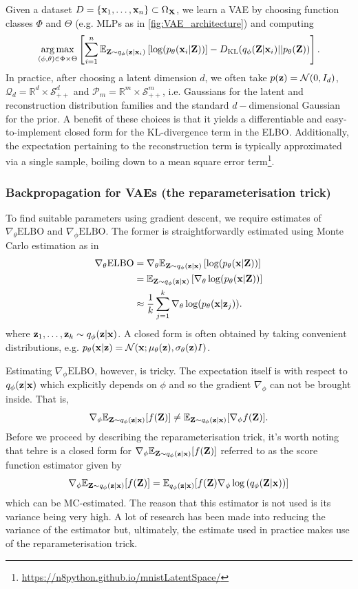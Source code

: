 \documentclass[11pt]{article}
\begin{document}
Given a dataset $D=\{\mathbf{x}_1,\dots,\mathbf{x}_n\}\subset\Omega_{\mathbf{X}}$, we learn a VAE by choosing function classes $\Phi$ and $\Theta$ (e.g. MLPs as in \autoref{fig:VAE_architecture}) and computing
$$
\operatorname*{arg\,max}_{(\phi,\theta)\in\Phi\times\Theta}
\left[
\sum_{i=1}^n
\mathbb{E}_{\mathbf{Z}\sim q_{\phi}(\mathbf{z}|\mathbf{x}_i)}\left[\log(p_{\theta}(\mathbf{x}_i|\mathbf{Z}))\right]-D_{\text{KL}}(q_{\phi}(\mathbf{Z}|\mathbf{x}_i)||p_{\theta}(\mathbf{Z}))
\right].
$$
In practice, after choosing a latent dimension $d$, we often take $p(\mathbf{z})=\mathcal{N}(0,I_d)$, $\mathcal{Q}_d=\mathbb{R}^d\times\mathcal{S}_{++}^d$ and $\mathcal{P}_m=\mathbb{R}^m\times\mathcal{S}_{++}^m$, i.e. Gaussians for the latent and reconstruction distribution families and the standard $d-$dimensional Gaussian for the prior. A benefit of these choices is that it yields a differentiable and easy-to-implement closed form for the KL-divergence term in the ELBO. Additionally, the expectation pertaining to the reconstruction term is typically approximated via a single sample, boiling down to a mean square error term\footnote{\url{https://n8python.github.io/mnistLatentSpace/}}.

\subsubsection{Backpropagation for VAEs (the reparameterisation trick)}
To find suitable parameters using gradient descent, we require estimates of $\nabla_{\theta}\text{ELBO}$ and $\nabla_{\phi}\text{ELBO}$. The former is straightforwardly estimated using Monte Carlo estimation as in
\begin{align*}
    \nabla_{\theta}\text{ELBO}
    &=
    \nabla_{\theta}\mathbb{E}_{\mathbf{Z}\sim q_{\phi}(\mathbf{z}|\mathbf{x})}\left[\log(p_{\theta}(\mathbf{x}|\mathbf{Z}))\right]\\
    &=
    \mathbb{E}_{\mathbf{Z}\sim q_{\phi}(\mathbf{z}|\mathbf{x})}\left[\nabla_{\theta}\log(p_{\theta}(\mathbf{x}|\mathbf{Z}))\right]\\
    &\approx
    \frac{1}{k}\sum_{j=1}^k \nabla_{\theta}\log(p_{\theta}(\mathbf{x}|\mathbf{z}_j)).
\end{align*}
where $\mathbf{z}_1,\dots,\mathbf{z}_k\sim q_{\phi}(\mathbf{z}|\mathbf{x})$. A closed form is often obtained by taking convenient distributions, e.g. $p_{\theta}(\mathbf{x}|\mathbf{z})=\mathcal{N}(\mathbf{x};\mu_{\theta}(\mathbf{z}),\sigma_{\theta}(\mathbf{z})I)$.

Estimating $\nabla_{\phi}\text{ELBO}$, however, is tricky. The expectation itself is with respect to $q_{\phi}(\mathbf{z}|\mathbf{x})$ which explicitly depends on $\phi$ and so the gradient $\nabla_{\phi}$ can not be brought inside. That is,
$$
\nabla_{\phi}\mathbb{E}_{\mathbf{Z}\sim q_{\phi}(\mathbf{z}|\mathbf{x})}[f(\mathbf{Z})]
\neq
\mathbb{E}_{\mathbf{Z}\sim q_{\phi}(\mathbf{z}|\mathbf{x})}[\nabla_{\phi}f(\mathbf{Z})].
$$
Before we proceed by describing the reparameterisation trick, it's worth noting that tehre is a closed form for $\nabla_{\phi}\mathbb{E}_{\mathbf{Z}\sim q_{\phi}(\mathbf{z}|\mathbf{x})}[f(\mathbf{Z})]$ referred to as the score function estimator given by
$$
\nabla_{\phi}\mathbb{E}_{\mathbf{Z}\sim q_{\phi}(\mathbf{z}|\mathbf{x})}[f(\mathbf{Z})]
=
\mathbb{E}_{q_{\phi}(\mathbf{z}|\mathbf{x})}[f(\mathbf{Z})\nabla_{\phi}\log\left(q_{\phi}(\mathbf{Z}|\mathbf{x})\right)]
$$
which can be MC-estimated. The reason that this estimator is not used is its variance being very high. A lot of research has been made into reducing the variance of the estimator but, ultimately, the estimate used in practice makes use of the reparameterisation trick.
\end{document}
